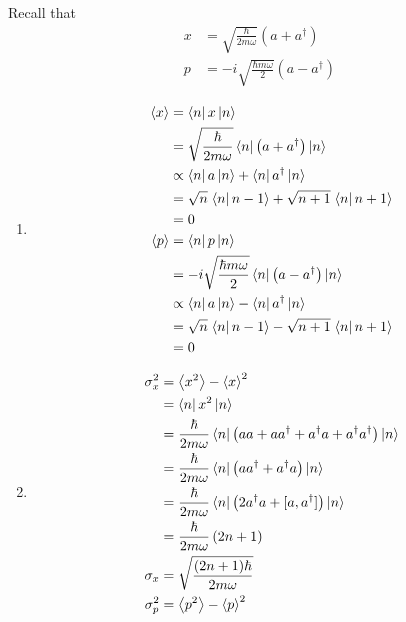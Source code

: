 \documentclass{article}
\begin{document}
\begin{prob}
\end{prob}
Recall that \begin{align*}
    x &= \sqrt{ \frac{\hbar}{2m\omega}} \left( a + a^\dag \right) \\
    p &= -i\sqrt{ \frac{\hbar m\omega}{2}} \left( a - a^\dag \right)
\end{align*}
\begin{enumerate}[label=(\alph*)]
    \item \begin{align*}
            \left\langle x \right\rangle &= \left\langle n \right\rvert x \left\lvert n \right\rangle \\
                     &= \sqrt{ \frac{\hbar}{2m\omega}} \left\langle n \right\rvert \left( a + a^\dag \right) \left\lvert n \right\rangle \\
                     &\propto \left\langle n \right\rvert a \left\lvert n \right\rangle + \left\langle n \right\rvert a^\dag \left\lvert n \right\rangle \\
                     &= \sqrt{n} \left.\left\langle n\right\vert n-1 \right\rangle + \sqrt{n+1} \left.\left\langle n\right\vert n+1 \right\rangle \\
                     &= 0 \\
            \left\langle p \right\rangle &= \left\langle n \right\rvert p \left\lvert n \right\rangle \\
                     &= -i\sqrt{ \frac{\hbar m\omega}{2}} \left\langle n \right\rvert \left( a - a^\dag \right) \left\lvert n \right\rangle \\
                     &\propto \left\langle n \right\rvert a \left\lvert n \right\rangle - \left\langle n \right\rvert a^\dag \left\lvert n \right\rangle \\
                     &= \sqrt{n} \left.\left\langle n\right\vert n-1 \right\rangle - \sqrt{n+1} \left.\left\langle n\right\vert n+1 \right\rangle \\
                     &= 0
    \end{align*}
\item \begin{align*}
        \sigma_x^2 &= \mean{x^2} - \mean{x}^2 \\
                   &= \bra{n} x^2 \ket{n} \\
                   &= \frac{\hbar}{2m\omega} \bra{n} \left( aa + aa^\dag + a^\dag a + a^\dag a^\dag \right) \ket{n} \\
                   &= \frac{\hbar}{2m\omega} \bra{n} \left( aa^\dag + a^\dag a\right) \ket{n} \\
                   &= \frac{\hbar}{2m\omega} \bra{n} \left( 2a^\dag a + [a, a^\dag] \right) \ket{n} \\
                   &= \frac{\hbar}{2m\omega} \left( 2n + 1 \right) \\
        \sigma_x &= \sqrt{ \frac{(2n+1)\hbar}{2m \omega}} \\
        \sigma_p^2 &= \mean{p^2} - \mean{p}^2 \\

\end{align*}
\end{enumerate}
\end{document}
